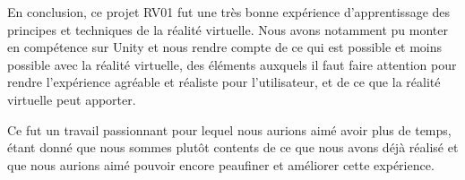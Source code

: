 \documentclass[a4paper]{elsarticle}
\begin{document}
En conclusion, ce projet RV01 fut une très bonne expérience d’apprentissage des principes et techniques de la réalité virtuelle. Nous avons notamment pu monter en compétence sur Unity et nous rendre compte de ce qui est possible et moins possible avec la réalité virtuelle, des éléments auxquels il faut faire attention pour rendre l’expérience agréable et réaliste pour l’utilisateur, et de ce que la réalité virtuelle peut apporter.

Ce fut un travail passionnant pour lequel nous aurions aimé avoir plus de temps, étant donné que nous sommes plutôt contents de ce que nous avons déjà réalisé et que nous aurions aimé pouvoir encore peaufiner et améliorer cette expérience.



\end{document}
